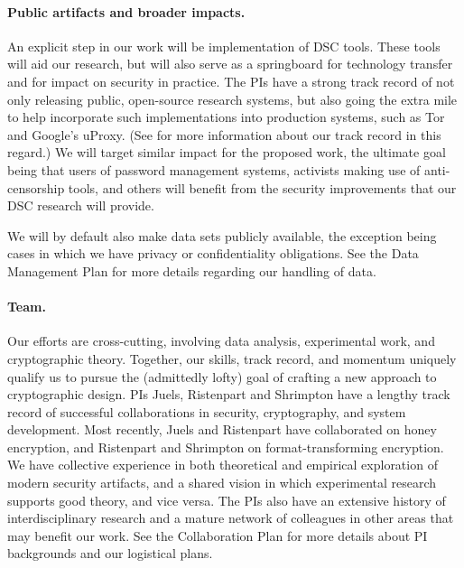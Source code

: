 {{\paragraph{Public artifacts and broader impacts.} An explicit step in our work
will be implementation of DSC tools. These tools will aid our research, but will also
serve as a springboard for technology transfer and for impact on
security in practice. The PIs have a strong track record of not only releasing
public, open-source research systems, 
but also going the extra mile to help incorporate such implementations into production
systems, such as Tor and Google's uProxy. 
(See  for more information about our track record in this
regard.)
We will target similar impact for the
proposed work, the ultimate goal being that users of password management systems, 
activists making use of anti-censorship tools, and
others will benefit from the security improvements that our DSC research will provide. 
 

We will by default also make data sets publicly available, the exception being
cases in which we have privacy or confidentiality obligations. See the Data
Management Plan for more details regarding our handling of data.


\paragraph{Team.} Our efforts are cross-cutting, involving data
analysis, experimental work, and cryptographic theory.   Together, our skills, track record, and momentum 
uniquely qualify us to pursue the
(admittedly lofty) goal of crafting a new approach to cryptographic design.
%
PIs Juels, Ristenpart and Shrimpton have a lengthy track record of
successful collaborations in security, cryptography, and system
development.  Most recently, Juels and Ristenpart have collaborated on
honey encryption, and Ristenpart and Shrimpton on format-transforming
encryption.  We have collective experience
in both theoretical and empirical exploration of modern security
artifacts, and a shared vision in which experimental research supports good
theory, and vice versa.  
The PIs also have an extensive history of interdisciplinary research and a mature network of colleagues in other areas that may
benefit our work.
See the Collaboration Plan for more details about PI backgrounds and our logistical plans.

}}
